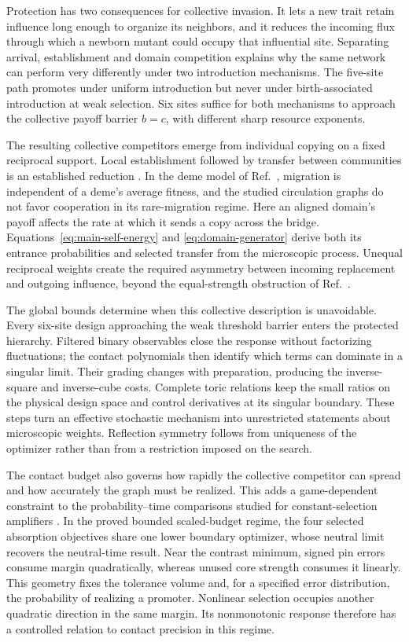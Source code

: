 \documentclass[aps,pre,reprint,amsmath,amssymb,longbibliography]{revtex4-2}
\begin{document}
Protection has two consequences for collective invasion. It lets a
new trait retain influence long enough to organize its neighbors, and
it reduces the incoming flux through which a newborn mutant could
occupy that influential site. Separating arrival, establishment and
domain competition explains why the same network can perform very
differently under two introduction mechanisms. The five-site path
promotes under uniform introduction but never under birth-associated
introduction at weak selection. Six sites suffice for both mechanisms
to approach the collective payoff barrier $b=c$, with different
sharp resource exponents.

The resulting collective competitors emerge from individual copying
on a fixed reciprocal support. Local establishment followed by
transfer between communities is an established reduction
\cite{PiresBroom2024Communities}. In the deme model of
Ref.~\cite{MoawadAbbaraBitbol2024Demes}, migration is independent of
a deme's average fitness, and the studied circulation graphs do not
favor cooperation in its rare-migration regime. Here an aligned
domain's payoff affects the rate at which it sends a copy across the
bridge. Equations~\eqref{eq:main-self-energy} and
\eqref{eq:domain-generator} derive both its entrance probabilities
and selected transfer from the microscopic process. Unequal reciprocal
weights create the required asymmetry between incoming replacement and
outgoing influence, beyond the equal-strength obstruction of
Ref.~\cite{AllenLippnerNowak2019}.

The global bounds determine when this collective description is
unavoidable. Every six-site design approaching the weak threshold
barrier enters the protected hierarchy. Filtered binary observables
close the response without factorizing fluctuations; the contact
polynomials then identify which terms can dominate in a singular
limit. Their grading changes with preparation, producing the
inverse-square and inverse-cube costs. Complete toric relations keep
the small ratios on the physical design space and control derivatives
at its singular boundary. These steps turn an effective stochastic
mechanism into unrestricted statements about microscopic weights.
Reflection symmetry follows from uniqueness of the optimizer rather
than from a restriction imposed on the search.

The contact budget also governs how rapidly the collective competitor
can spread and how accurately the graph must be realized. This adds
a game-dependent constraint to the probability--time comparisons
studied for constant-selection amplifiers
\cite{SlowTkadlec2019,SlowTkadlec2021}. In the proved bounded
scaled-budget regime, the four selected absorption objectives share
one lower boundary optimizer, whose neutral limit recovers the
neutral-time result. Near the contrast minimum, signed pin
errors consume margin quadratically, whereas unused core strength
consumes it linearly. This geometry fixes the tolerance volume and,
for a specified error distribution, the probability of realizing a
promoter. Nonlinear selection occupies another quadratic direction
in the same margin. Its nonmonotonic response
\cite{McAvoyRaoHauert2021} therefore has a controlled relation to
contact precision in this regime.
\end{document}
